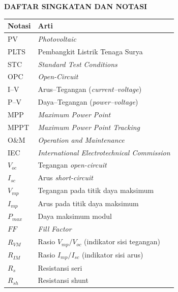 
\clearpage
{}
{}

\begin{center}
    \large \textbf{DAFTAR SINGKATAN DAN NOTASI}
\end{center}
\vspace{3em}

\begin{center}
    \begin{tabularx}{0.8\textwidth} {
            >{\raggedright\arraybackslash}X
            >{\raggedright\arraybackslash}X}
        \toprule
        \textbf{Notasi} & \textbf{Arti} \\
        \midrule
        PV       & \textit{Photovoltaic} \\
        PLTS     & Pembangkit Listrik Tenaga Surya \\
        STC      & \textit{Standard Test Conditions} \\
        OPC      & \textit{Open-Circuit} \\
        I--V     & Arus--Tegangan (\textit{current--voltage}) \\
        P--V     & Daya--Tegangan (\textit{power--voltage}) \\
        MPP      & \textit{Maximum Power Point} \\
        MPPT     & \textit{Maximum Power Point Tracking} \\
        O\&M     & \textit{Operation and Maintenance} \\
        IEC      & \textit{International Electrotechnical Commission} \\
        $V_{oc}$ & Tegangan \textit{open-circuit} \\
        $I_{sc}$ & Arus \textit{short-circuit} \\
        $V_{mp}$ & Tegangan pada titik daya maksimum \\
        $I_{mp}$ & Arus pada titik daya maksimum \\
        $P_{max}$& Daya maksimum modul \\
        $FF$     & \textit{Fill Factor} \\
        $R_{VM}$ & Rasio $V_{mp}/V_{oc}$ (indikator sisi tegangan) \\
        $R_{IM}$ & Rasio $I_{mp}/I_{sc}$ (indikator sisi arus) \\
        $R_{s}$  & Resistansi seri \\
        $R_{sh}$ & Resistansi shunt \\
        \bottomrule
    \end{tabularx}
\end{center}